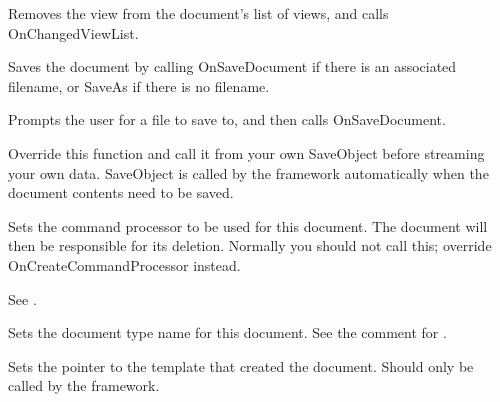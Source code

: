 

Removes the view from the document's list of views, and calls OnChangedViewList.



Saves the document by calling OnSaveDocument if there is an associated filename,
or SaveAs if there is no filename.



Prompts the user for a file to save to, and then calls OnSaveDocument.



Override this function and call it from your own SaveObject before
streaming your own data. SaveObject is called by the framework
automatically when the document contents need to be saved.



Sets the command processor to be used for this document. The document will then be responsible
for its deletion. Normally you should not call this; override OnCreateCommandProcessor
instead.

See .



Sets the document type name for this document. See the comment for .



Sets the pointer to the template that created the document. Should only be called by the
framework.



